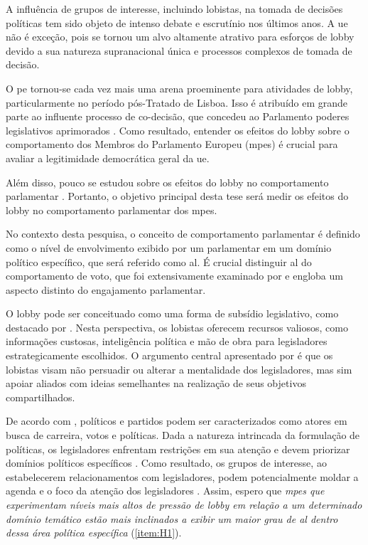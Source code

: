 
A influência de grupos de interesse, incluindo lobistas, na tomada de decisões políticas tem sido objeto de intenso debate e escrutínio nos últimos anos. A \acrfull{ue} não é exceção, pois se tornou um alvo altamente atrativo para esforços de lobby devido a sua natureza supranacional única e processos complexos de tomada de decisão.

O \acrfull{pe} tornou-se cada vez mais uma arena proeminente para atividades de lobby, particularmente no período pós-Tratado de Lisboa. Isso é atribuído em grande parte ao influente processo de co-decisão, que concedeu ao Parlamento poderes legislativos aprimorados \cite{Dionigi2017}. Como resultado, entender os efeitos do lobby sobre o comportamento dos Membros do Parlamento Europeu (\acrshort{mpe}s) é crucial para avaliar a legitimidade democrática geral da \acrshort{ue}.

Além disso, pouco se estudou sobre os efeitos do lobby no comportamento parlamentar \cite{Huwyler2022}. Portanto, o objetivo principal desta tese será medir os efeitos do lobby no comportamento parlamentar dos \acrshort{mpe}s.

No contexto desta pesquisa, o conceito de comportamento parlamentar é definido como o nível de envolvimento exibido por um parlamentar em um domínio político específico, que será referido como \acrfull{al}. É crucial distinguir \acrshort{al} do comportamento de voto, que foi extensivamente examinado por \cite{Hix2002} e engloba um aspecto distinto do engajamento parlamentar.

O lobby pode ser conceituado como uma forma de subsídio legislativo, como destacado por \cite{Hall2006}. Nesta perspectiva, os lobistas oferecem recursos valiosos, como informações custosas, inteligência política e mão de obra para legisladores estrategicamente escolhidos. O argumento central apresentado por \cite{Hall2006} é que os lobistas visam não persuadir ou alterar a mentalidade dos legisladores, mas sim apoiar aliados com ideias semelhantes na realização de seus objetivos compartilhados.

De acordo com \cite{muller1999}, políticos e partidos podem ser caracterizados como atores em busca de carreira, votos e políticas. Dada a natureza intrincada da formulação de políticas, os legisladores enfrentam restrições em sua atenção e devem priorizar domínios políticos específicos \cite{Hall2006, jones2005politics}. Como resultado, os grupos de interesse, ao estabelecerem relacionamentos com legisladores, podem potencialmente moldar a agenda e o foco da atenção dos legisladores \cite{Huwyler2022}. Assim, espero que \emph{\acrshort{mpe}s que experimentam níveis mais altos de pressão de lobby em relação a um determinado domínio temático estão mais inclinados a exibir um maior grau de \acrshort{al} dentro dessa área política específica} (\ref{item:H1}).

